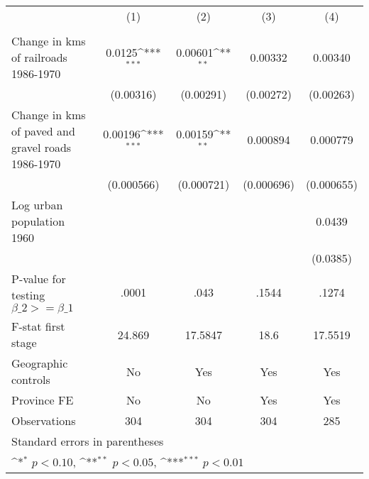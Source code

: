 {
\def\sym#1{\ifmmode^{#1}\else\(^{#1}\)\fi}
\begin{tabular}{l*{4}{c}}
\hline\hline
                &\multicolumn{1}{c}{(1)}&\multicolumn{1}{c}{(2)}&\multicolumn{1}{c}{(3)}&\multicolumn{1}{c}{(4)}\\
                &\multicolumn{1}{c}{}&\multicolumn{1}{c}{}&\multicolumn{1}{c}{}&\multicolumn{1}{c}{}\\
\hline
Change in kms of railroads 1986-1970&   0.0125\sym{***}&  0.00601\sym{**} &  0.00332         &  0.00340         \\
                &(0.00316)         &(0.00291)         &(0.00272)         &(0.00263)         \\
[1em]
Change in kms of paved and gravel roads 1986-1970&  0.00196\sym{***}&  0.00159\sym{**} & 0.000894         & 0.000779         \\
                &(0.000566)         &(0.000721)         &(0.000696)         &(0.000655)         \\
[1em]
Log urban population 1960&                  &                  &                  &   0.0439         \\
                &                  &                  &                  & (0.0385)         \\
\hline
P-value for testing $\beta\_{2} >= \beta\_{1}$&    .0001         &     .043         &    .1544         &    .1274         \\
F-stat first stage&   24.869         &  17.5847         &     18.6         &  17.5519         \\
Geographic controls&       No         &      Yes         &      Yes         &      Yes         \\
Province FE     &       No         &       No         &      Yes         &      Yes         \\
Observations    &      304         &      304         &      304         &      285         \\
\hline\hline
\multicolumn{5}{l}{\footnotesize Standard errors in parentheses}\\
\multicolumn{5}{l}{\footnotesize \sym{*} \(p<0.10\), \sym{**} \(p<0.05\), \sym{***} \(p<0.01\)}\\
\end{tabular}
}
